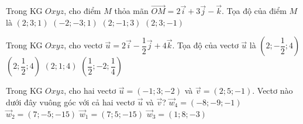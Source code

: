\begin{ex}%
Trong KG $Oxyz$, cho điểm $M$ thỏa mãn $\overrightarrow{OM}=2\overrightarrow{i}+3\overrightarrow{j}-\overrightarrow{k}$. Tọa độ của điểm $M$ là
\choice
{$(2;3;1)$}
{$(-2;-3;1)$}
{$(2;-1;3)$}
{\True $(2;3;-1)$}
\end{ex}

\begin{ex}%
Trong KG $Oxyz$, cho vectơ $\overrightarrow{u}=2\overrightarrow{i}-\dfrac{1}{2}\overrightarrow{j}+4\overrightarrow{k}$. Tọa độ của vectơ $\overrightarrow{u}$ là
\choice
{\True $\left(2;-\dfrac{1}{2};4 \right)$}
{$\left(2;\dfrac{1}{2};4 \right)$}
{$(2;1;4)$}
{$\left(\dfrac{1}{2};-2;\dfrac{1}{4} \right)$}
\end{ex}

\begin{ex}%
Trong KG $Oxyz$, cho hai vectơ $\overrightarrow{u}=(-1;3;-2)$ và $\overrightarrow{v}=(2;5;-1)$. Vectơ nào dưới đây vuông góc với cả hai vectơ $\overrightarrow{u}$ và $\overrightarrow{v}$?
\choice
{${\overrightarrow{w}_4}=(-8;-9;-1)$}
{\True ${\overrightarrow{w}_2}=(7;-5;-15)$}
{${\overrightarrow{w}_1}=(7;5;-15)$}
{${\overrightarrow{w}_3}=(1;8;-3)$}
\end{ex}

